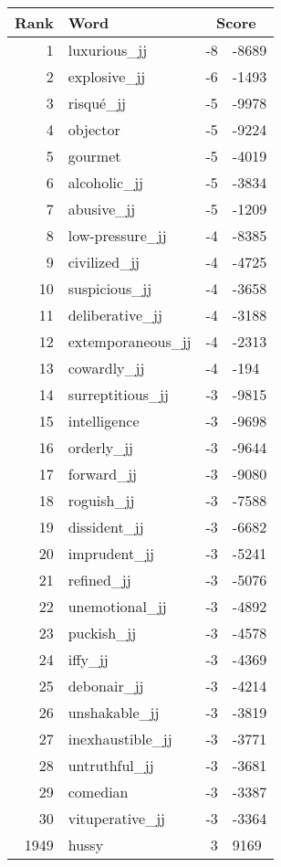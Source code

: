 \begin{longtable}[!htbp]{| rlr@{.}l |}
    \hline
    \textbf{Rank} & \textbf{Word} & \multicolumn{2}{c|}{\textbf{Score}} \\
    \hline
    \endhead
    1 & luxurious\_jj & -8 & -8689 \\
    2 & explosive\_jj & -6 & -1493 \\
    3 & risqué\_jj & -5 & -9978 \\
    4 & objector & -5 & -9224 \\
    5 & gourmet & -5 & -4019 \\
    6 & alcoholic\_jj & -5 & -3834 \\
    7 & abusive\_jj & -5 & -1209 \\
    8 & low-pressure\_jj & -4 & -8385 \\
    9 & civilized\_jj & -4 & -4725 \\
    10 & suspicious\_jj & -4 & -3658 \\
    11 & deliberative\_jj & -4 & -3188 \\
    12 & extemporaneous\_jj & -4 & -2313 \\
    13 & cowardly\_jj & -4 & -194 \\
    14 & surreptitious\_jj & -3 & -9815 \\
    15 & intelligence & -3 & -9698 \\
    16 & orderly\_jj & -3 & -9644 \\
    17 & forward\_jj & -3 & -9080 \\
    18 & roguish\_jj & -3 & -7588 \\
    19 & dissident\_jj & -3 & -6682 \\
    20 & imprudent\_jj & -3 & -5241 \\
    21 & refined\_jj & -3 & -5076 \\
    22 & unemotional\_jj & -3 & -4892 \\
    23 & puckish\_jj & -3 & -4578 \\
    24 & iffy\_jj & -3 & -4369 \\
    25 & debonair\_jj & -3 & -4214 \\
    26 & unshakable\_jj & -3 & -3819 \\
    27 & inexhaustible\_jj & -3 & -3771 \\
    28 & untruthful\_jj & -3 & -3681 \\
    29 & comedian & -3 & -3387 \\
    30 & vituperative\_jj & -3 & -3364 \\
    1949 & hussy & 3 & 9169 \\

\end{longtable}

